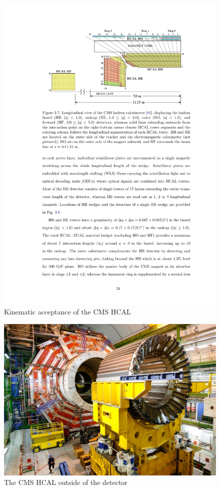 \begin{figure}
\begin{center}
\includegraphics[width=.95\textwidth]{pics/hcal_diagram}
\end{center}
\caption{Kinematic acceptance of the CMS HCAL}
\label{fig:hcal_diagram}
\end{figure}

\begin{figure}
\begin{center}
\includegraphics[width=.65\textwidth]{pics/naked_hcal}
\end{center}
\caption{The CMS HCAL outside of the detector}
\label{fig:hcal_naked}
\end{figure}


